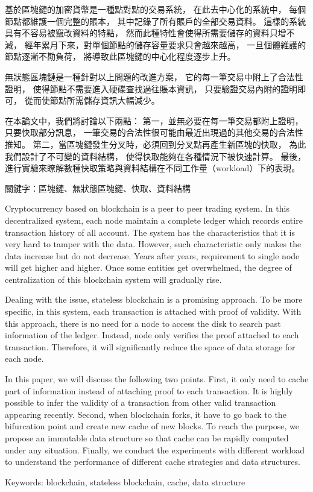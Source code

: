 \begin{abstractzh}
基於區塊鏈的加密貨幣是一種點對點的交易系統，
在此去中心化的系統中，
每個節點都維護一個完整的賬本，
其中記錄了所有賬戶的全部交易資料。
這樣的系統具有不容易被竄改資料的特點，
然而此種特性會使得所需要儲存的資料只增不減，
經年累月下來，對單個節點的儲存容量要求只會越來越高，
一旦個體維護的節點逐漸不勘負荷，
將導致此區塊鏈的中心化程度逐步上升。

無狀態區塊鏈是一種針對以上問題的改進方案，
它的每一筆交易中附上了合法性證明，
使得節點不需要進入硬碟查找過往賬本資訊，
只要驗證交易內附的證明即可，
從而使節點所需儲存資訊大幅減少。

在本論文中，我們將討論以下兩點：
第一，並無必要在每一筆交易都附上證明，
只要快取部分訊息，
一筆交易的合法性很可能由最近出現過的其他交易的合法性推知。
第二，當區塊鏈發生分叉時，必須回到分叉點再產生新區塊的快取，
為此我們設計了不可變的資料結構，
使得快取能夠在各種情況下被快速計算。
最後，進行實驗來瞭解數種快取策略與資料結構在不同工作量（workload）下的表現。


\bigbreak
\noindent
關鍵字：區塊鏈、無狀態區塊鏈、快取、資料結構
\end{abstractzh}

\begin{abstracten}

Cryptocurrency based on blockchain is a peer to peer trading system. In this decentralized system, each node maintain a complete ledger which records entire transaction history of all account. The system has the characteristics that it is very hard to tamper with the data. However, such characteristic only makes the data increase but do not decrease. Years after years, requirement to single node will get higher and higher. Once some entities get overwhelmed, the degree of centralization of this blockchain system will gradually rise.

Dealing with the issue, stateless blockchain is a promising approach. To be more specific, in this system, each transaction is attached with proof of validity. With this approach, there is no need for a node to access the disk to search past information of the ledger. Instead, node only verifies the proof attached to each transaction. Therefore, it will significantly reduce the space of data storage for each node.

In this paper, we will discuss the following two points.
First, it only need to cache part of information instead of attaching proof to each transaction. It is highly possible to infer the validity of a transaction from other valid transaction appearing recently. Second, when blockchain forks, it have to go back to the bifurcation point and create new cache of new blocks. To reach the purpose, we propose an immutable data structure so that cache can be rapidly computed under any situation. Finally, we conduct the experiments with different workload to understand the performance of different cache strategies and data structures.

\bigbreak
\noindent
Keywords: blockchain, stateless blockchain, cache, data structure
\end{abstracten}

